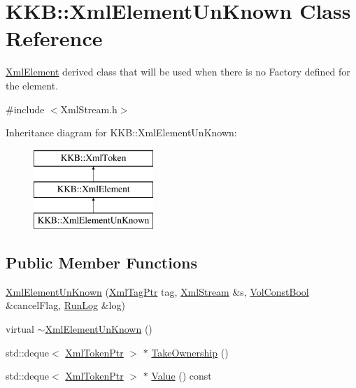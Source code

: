 \hypertarget{class_k_k_b_1_1_xml_element_un_known}{}\section{K\+KB\+:\+:Xml\+Element\+Un\+Known Class Reference}
\label{class_k_k_b_1_1_xml_element_un_known}


\hyperlink{class_k_k_b_1_1_xml_element}{Xml\+Element} derived class that will be used when there is no Factory defined for the element. 




{\ttfamily \#include $<$Xml\+Stream.\+h$>$}

Inheritance diagram for K\+KB\+:\+:Xml\+Element\+Un\+Known\+:\begin{figure}[H]
\begin{center}
\leavevmode
\includegraphics[height=3.000000cm]{class_k_k_b_1_1_xml_element_un_known}
\end{center}
\end{figure}
\subsection*{Public Member Functions}
\begin{DoxyCompactItemize}
\item 
\hyperlink{class_k_k_b_1_1_xml_element_un_known_a38766b4e928f2d5705d33145fb3665bc}{Xml\+Element\+Un\+Known} (\hyperlink{namespace_k_k_b_a9253a3ea8a5da18ca82be4ca2b390ef0}{Xml\+Tag\+Ptr} tag, \hyperlink{class_k_k_b_1_1_xml_stream}{Xml\+Stream} \&s, \hyperlink{namespace_k_k_b_a7d390f568e2831fb76b86b56c87bf92f}{Vol\+Const\+Bool} \&cancel\+Flag, \hyperlink{class_k_k_b_1_1_run_log}{Run\+Log} \&log)
\item 
virtual \hyperlink{class_k_k_b_1_1_xml_element_un_known_a3504ae0803666fd8e5726023c4d2052a}{$\sim$\+Xml\+Element\+Un\+Known} ()
\item 
std\+::deque$<$ \hyperlink{class_k_k_b_1_1_xml_token_a2379a40d8ebd64e9125cf68e34da13ab}{Xml\+Token\+Ptr} $>$ $\ast$ \hyperlink{class_k_k_b_1_1_xml_element_un_known_a7c04dccc6ffbf40d05f5c7841873ca9f}{Take\+Ownership} ()
\item 
std\+::deque$<$ \hyperlink{class_k_k_b_1_1_xml_token_a2379a40d8ebd64e9125cf68e34da13ab}{Xml\+Token\+Ptr} $>$ $\ast$ \hyperlink{class_k_k_b_1_1_xml_element_un_known_aa777364ac9919010ba0f20dbc2b6e420}{Value} () const 
\end{DoxyCompactItemize}
